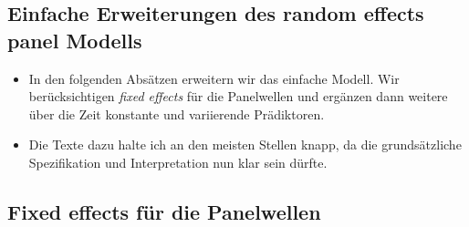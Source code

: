 \documentclass[
]{book}
\newenvironment{Shaded}{\begin{snugshade}}{\end{snugshade}}
\newcommand{\CommentTok}[1]{\textcolor[rgb]{0.56,0.35,0.01}{\textit{#1}}}
\newcommand{\DataTypeTok}[1]{\textcolor[rgb]{0.13,0.29,0.53}{#1}}
\newcommand{\DecValTok}[1]{\textcolor[rgb]{0.00,0.00,0.81}{#1}}
\newcommand{\KeywordTok}[1]{\textcolor[rgb]{0.13,0.29,0.53}{\textbf{#1}}}
\newcommand{\NormalTok}[1]{#1}
\newcommand{\OperatorTok}[1]{\textcolor[rgb]{0.81,0.36,0.00}{\textbf{#1}}}
\newcommand{\OtherTok}[1]{\textcolor[rgb]{0.56,0.35,0.01}{#1}}
\newcommand{\StringTok}[1]{\textcolor[rgb]{0.31,0.60,0.02}{#1}}
\providecommand{\tightlist}{%
  \setlength{\itemsep}{0pt}\setlength{\parskip}{0pt}}
\begin{document}
\hypertarget{einfache-erweiterungen-des-random-effects-panel-modells}{%
\subsection*{Einfache Erweiterungen des random effects panel Modells}\label{einfache-erweiterungen-des-random-effects-panel-modells}}

\begin{itemize}
\tightlist
\item
  In den folgenden Absätzen erweitern wir das einfache Modell. Wir berücksichtigen \emph{fixed effects} für die Panelwellen und ergänzen dann weitere über die Zeit konstante und variierende Prädiktoren.
\item
  Die Texte dazu halte ich an den meisten Stellen knapp, da die grundsätzliche Spezifikation und Interpretation nun klar sein dürfte.
\end{itemize}

\hypertarget{fixed-effects-fuxfcr-die-panelwellen}{%
\subsection*{Fixed effects für die Panelwellen}\label{fixed-effects-fuxfcr-die-panelwellen}}

\begin{Shaded}
\end{Shaded}
\end{document}
